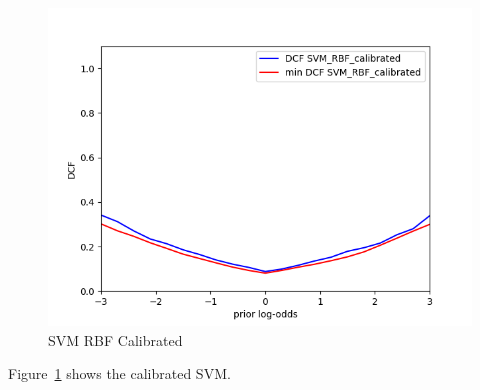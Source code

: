 \documentclass[english]{report}
\begin{document}
\begin{figure}[H]
    \includegraphics[scale=0.5]{../../images/comparison/evaluation/DCF_SVM_RBF_calibrated}
    \centering
    \caption{SVM RBF Calibrated}
    \label{fig:SVM_RBF_eval_cal}
\end{figure}
Figure~\ref{fig:SVM_RBF_eval_cal} shows the calibrated SVM.
\end{document}
